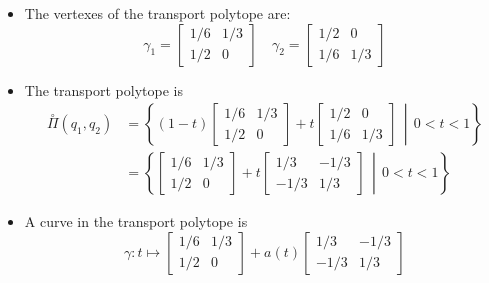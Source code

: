 \documentclass[xcolor=svgnames]{beamer}
\newcommand{\openplan}[2]{\overset{\circ}\Pi\left(#1,#2\right)}
\newcommand{\setof}[2]{\left\{#1 \, \middle| \, #2 \right\}}
\begin{document}
\begin{frame}
\begin{itemize}
\item The vertexes of the transport polytope are:
\begin{equation*}
\gamma_1 = \begin{bmatrix} 1/6 & 1/3 \\ 1/2 & 0 \end{bmatrix} \quad 
\gamma_2 = \begin{bmatrix} 1/2 & 0 \\ 1/6 & 1/3 \end{bmatrix}\end{equation*}
\item The transport polytope is 
\begin{align*}
 \openplan{q_1}{q_2} &= \setof{(1-t)\begin{bmatrix} 1/6 & 1/3 \\ 1/2 & 0 \end{bmatrix} + t \begin{bmatrix} 1/2 & 0 \\ 1/6 & 1/3 \end{bmatrix}}{0 < t < 1} \\
 &= \setof{\begin{bmatrix} 1/6 & 1/3 \\ 1/2 & 0 \end{bmatrix} + t \begin{bmatrix} 1/3 & -1/3 \\ -1/3 & 1/3 \end{bmatrix}}{0 < t < 1}
\end{align*}
\item A curve in the transport polytope is 
\begin{equation*}
   \gamma \colon t \mapsto \begin{bmatrix} 1/6 & 1/3 \\ 1/2 & 0 \end{bmatrix} + a(t) \begin{bmatrix} 1/3 & -1/3 \\ -1/3 & 1/3 \end{bmatrix}
\end{equation*}

\end{itemize}
\end{frame}
\end{document}
